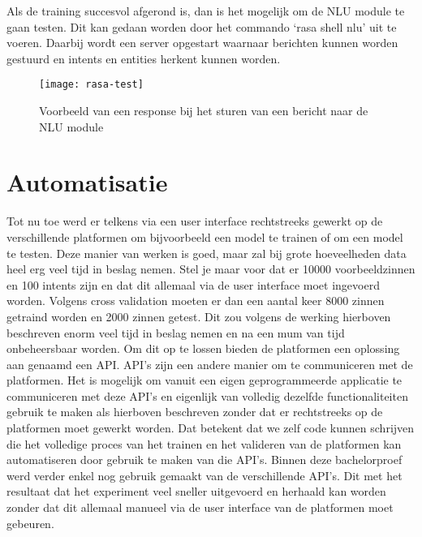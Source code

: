 Als de training succesvol afgerond is, dan is het mogelijk om de NLU module te gaan testen. Dit kan gedaan worden door het commando ‘rasa shell nlu’ uit te voeren. Daarbij wordt een server opgestart waarnaar berichten kunnen worden gestuurd en intents en entities herkent kunnen worden. 

\begin{figure}[H]
    \label{fig:rasa-test}
    \centering
    \texttt{[image: rasa-test]}
    \caption{Voorbeeld van een response bij het sturen van een bericht naar de NLU module}
\end{figure}

\section{Automatisatie}
\label{sec:automatisatie}

Tot nu toe werd er telkens via een user interface rechtstreeks gewerkt op de verschillende platformen om bijvoorbeeld een model te trainen of om een model te testen. Deze manier van werken is goed, maar zal bij grote hoeveelheden data heel erg veel tijd in beslag nemen. Stel je maar voor dat er 10000 voorbeeldzinnen  en 100 intents zijn en dat dit allemaal via de user interface moet ingevoerd worden. Volgens cross validation moeten er dan een aantal keer 8000 zinnen getraind worden en 2000 zinnen getest. Dit zou volgens de werking hierboven beschreven enorm veel tijd in beslag nemen en na een mum van tijd onbeheersbaar worden. Om dit op te lossen bieden de platformen een oplossing aan genaamd een API. API’s zijn een andere manier om te communiceren met de platformen. Het is mogelijk om vanuit een eigen geprogrammeerde applicatie te communiceren met deze API’s en eigenlijk van volledig dezelfde functionaliteiten gebruik te maken als hierboven beschreven zonder dat er rechtstreeks op de platformen moet gewerkt worden. Dat betekent dat we zelf code kunnen schrijven die het volledige proces van het trainen en het valideren van de platformen kan automatiseren door gebruik te maken van die API’s. Binnen deze bachelorproef werd verder enkel nog gebruik gemaakt van de verschillende API’s. Dit met het resultaat dat het experiment veel sneller uitgevoerd en herhaald kan worden zonder dat dit allemaal manueel via de user interface van de platformen moet gebeuren.
























